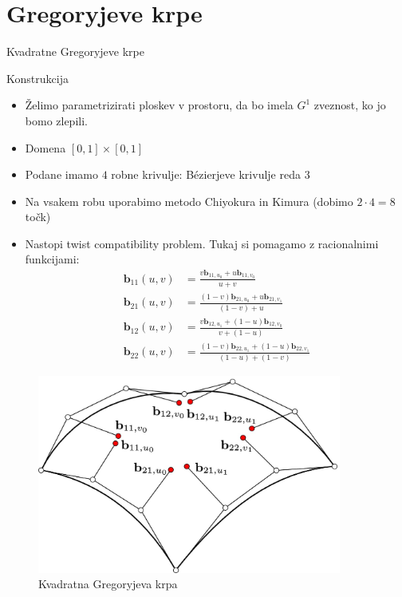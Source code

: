 \documentclass[a4paper,8pt]{beamer}
\newcommand{\tbf}{\textbf}
\begin{document}
\section{Gregoryjeve krpe}
\begin{frame}{Kvadratne Gregoryjeve krpe}


Konstrukcija
\begin{itemize}
	\item Želimo parametrizirati ploskev v prostoru, da bo imela $G^1$ zveznost, ko jo bomo zlepili.
	\item Domena $[0,1] \times [0,1]$
	\item Podane imamo $4$ robne krivulje: Bézierjeve krivulje reda $3$
	\item Na vsakem robu uporabimo metodo Chiyokura in Kimura (dobimo $2 \cdot 4 = 8$ točk)
	\item Nastopi twist compatibility problem. Tukaj si pomagamo z racionalnimi funkcijami:
		\begin{align*}
		\tbf{b}_{11} (u, v) &=  \frac{v \textbf{b}_{11,u_0}+u\tbf{b}_{11,v_0}}{u +v} \\
		\tbf{b}_{21} (u, v) &= \frac{(1-v) \tbf{b}_{21,u_0}+u\tbf{b}_{21,v_1}}{(1-v)+u} \\
		\tbf{b}_{12} (u, v) &= \frac{v \tbf{b}_{12,u_1}+(1-u)\tbf{b}_{12,v_0}}{v+(1-u)} \\
		\tbf{b}_{22} (u, v) &= \frac{(1-v) \tbf{b}_{22,u_1}+(1-u)\tbf{b}_{22,v_1}}{(1-u)+(1-v)} 
		\end{align*}
\end{itemize}
	
\end{frame}
\begin{frame}
	\begin{figure}[h]
		\centering
		\includegraphics[width=10cm]{gregory_krpe_kvadratna.jpg}
		\caption{Kvadratna Gregoryjeva krpa}
	\end{figure}
\end{frame}
\end{document}
